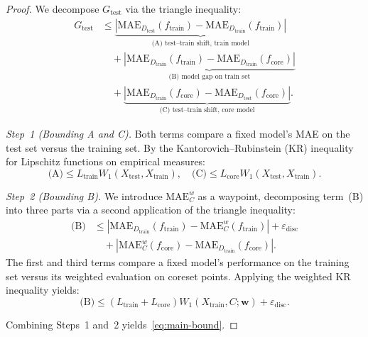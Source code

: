 \documentclass[journal]{IEEEtran}
\newcommand{\MAE}{\mathrm{MAE}}
\newcommand{\Wone}{W_1}
\newcommand{\Xtrain}{X_{\mathrm{train}}}
\newcommand{\Xtest}{X_{\mathrm{test}}}
\newcommand{\Dtrain}{D_{\mathrm{train}}}
\newcommand{\Dtest}{D_{\mathrm{test}}}
\newcommand{\ftrain}{f_{\mathrm{train}}}
\newcommand{\fcore}{f_{\mathrm{core}}}
\newcommand{\Ltrain}{L_{\mathrm{train}}}
\newcommand{\Lcore}{L_{\mathrm{core}}}
\newcommand{\edisc}{\varepsilon_{\mathrm{disc}}}
\newcommand{\Gtest}{G_{\mathrm{test}}}
\begin{document}
\begin{proof}
We decompose $\Gtest$ via the triangle inequality:
\begin{align}\label{eq:triangle}
  \Gtest &\le
    \underbrace{|\MAE_{\Dtest}(\ftrain) -
      \MAE_{\Dtrain}(\ftrain)|}_{\text{(A) test--train shift,
      train model}}
    \nonumber \\
  &\quad + \underbrace{|\MAE_{\Dtrain}(\ftrain) -
      \MAE_{\Dtrain}(\fcore)|}_{\text{(B) model gap on train set}}
    \nonumber \\
  &\quad + \underbrace{|\MAE_{\Dtrain}(\fcore) -
      \MAE_{\Dtest}(\fcore)|}_{\text{(C) test--train shift,
      core model}}.
\end{align}

\emph{Step~1 (Bounding A and C).}
Both terms compare a fixed model's MAE on the test set versus the
training set.
By the Kantorovich--Rubinstein (KR) inequality for Lipschitz
functions on empirical measures:
\begin{equation}
  \text{(A)} \le \Ltrain \Wone(\Xtest, \Xtrain), \quad
  \text{(C)} \le \Lcore \Wone(\Xtest, \Xtrain).
\end{equation}

\emph{Step~2 (Bounding B).}
We introduce $\MAE^w_C$ as a waypoint, decomposing term~(B) into
three parts via a second application of the triangle inequality:
\begin{align}
  \text{(B)} &\le
    |\MAE_{\Dtrain}(\ftrain) - \MAE^w_C(\ftrain)|
    + \edisc \nonumber \\
  &\quad + |\MAE^w_C(\fcore) - \MAE_{\Dtrain}(\fcore)|.
\end{align}
The first and third terms compare a fixed model's performance on the
training set versus its weighted evaluation on coreset points.
Applying the weighted KR inequality yields:
\begin{equation}
  \text{(B)} \le (\Ltrain + \Lcore) \Wone(\Xtrain, C; \mathbf{w})
  + \edisc.
\end{equation}

Combining Steps~1 and~2 yields~\eqref{eq:main-bound}.
\end{proof}
\end{document}
